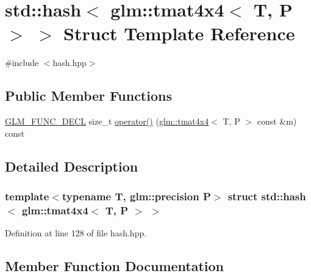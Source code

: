 \hypertarget{structstd_1_1hash_3_01glm_1_1tmat4x4_3_01_t_00_01_p_01_4_01_4}{}\section{std\+::hash$<$ glm\+::tmat4x4$<$ T, P $>$ $>$ Struct Template Reference}
\label{structstd_1_1hash_3_01glm_1_1tmat4x4_3_01_t_00_01_p_01_4_01_4}


{\ttfamily \#include $<$hash.\+hpp$>$}

\subsection*{Public Member Functions}
\begin{DoxyCompactItemize}
\item 
\mbox{\hyperlink{setup_8hpp_ab2d052de21a70539923e9bcbf6e83a51}{G\+L\+M\+\_\+\+F\+U\+N\+C\+\_\+\+D\+E\+CL}} size\+\_\+t \mbox{\hyperlink{structstd_1_1hash_3_01glm_1_1tmat4x4_3_01_t_00_01_p_01_4_01_4_a3bd23d68315c4cb50e80fe41e3aa8b1c}{operator()}} (\mbox{\hyperlink{structglm_1_1tmat4x4}{glm\+::tmat4x4}}$<$ T, P $>$ const \&m) const
\end{DoxyCompactItemize}


\subsection{Detailed Description}
\subsubsection*{template$<$typename T, glm\+::precision P$>$\newline
struct std\+::hash$<$ glm\+::tmat4x4$<$ T, P $>$ $>$}



Definition at line 128 of file hash.\+hpp.



\subsection{Member Function Documentation}
\mbox{\label{structstd_1_1hash_3_01glm_1_1tmat4x4_3_01_t_00_01_p_01_4_01_4_a3bd23d68315c4cb50e80fe41e3aa8b1c}} 
